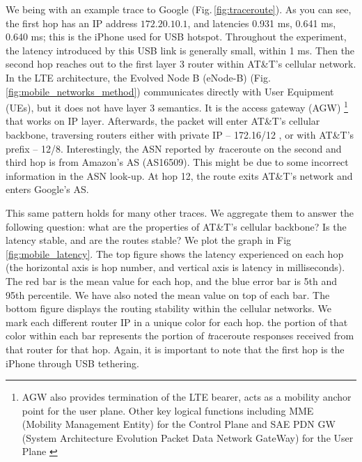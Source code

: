 We being with an example trace to Google (Fig.\,\ref{fig:traceroute}). As you can see, the first hop has an IP address $172.20.10.1$, and latencies 0.931 ms, 0.641 ms, 0.640 ms; this is the iPhone used for USB hotspot. Throughout the experiment, the latency introduced by this USB link is generally small, within 1 ms. Then the second hop reaches out to the first layer 3 router within AT\&T's cellular network. In the LTE architecture, the Evolved Node B (eNode-B) (Fig.\,\ref{fig:mobile_networks_method}) communicates directly with User Equipment (UEs), but it does not have layer 3 semantics. It is the access gateway (AGW) \footnote{AGW also provides termination of the LTE bearer, acts as a mobility anchor point for the user plane. Other key logical functions including MME (Mobility Management Entity) for the Control Plane and SAE PDN GW (System Architecture Evolution Packet Data Network GateWay) for the User Plane \cite{nortel}} that works on IP layer. Afterwards, the packet will enter AT\&T's cellular backbone, traversing routers either with private IP -- 172.16/12 \cite{rekhterrfc}, or with AT\&T's prefix -- 12/8. Interestingly, the ASN reported by {\textit traceroute} on the second and third hop is from Amazon's AS (AS16509). This might be due to some incorrect information in the ASN look-up. At hop 12, the route exits AT\&T's network and enters Google's AS.

This same pattern holds for many other traces. We aggregate them to answer the following question: what are the properties of AT\&T's cellular backbone? Is the latency stable, and are the routes stable? We plot the graph in Fig\,\ref{fig:mobile_latency}. The top figure shows the latency experienced on each hop (the horizontal axis is hop number, and vertical axis is latency in milliseconds). The red bar is the mean value for each hop, and the blue error bar is 5th and 95th percentile. We have also noted the mean value on top of each bar. The bottom figure displays the routing stability within the cellular networks. We mark each different router IP in a unique color for each hop. the portion of that color within each bar represents the portion of {\textit traceroute} responses received from that router for that hop. Again, it is important to note that the first hop is the iPhone through USB tethering.

